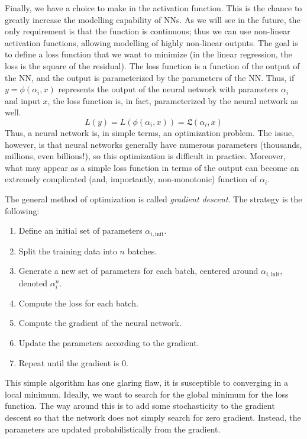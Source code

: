 Finally, we have a choice to make in the activation function. This is the chance to greatly increase the modelling capability of NNs. As we will see in the future, the only requirement is that the function is continuous; thus we can use non-linear activation functions, allowing modelling of highly non-linear outputs. The goal is to define a loss function that we want to minimize (in the linear regression, the loss is the square of the residual). The loss function is a function of the output of the NN, and the output is parameterized by the parameters of the NN. Thus, if $y=\phi(\alpha_i,x)$ represents the output of the neural network with parameters $\alpha_i$ and input $x$, the loss function is, in fact, parameterized by the neural network as well.
\begin{equation}
	L(y) = L(\phi(\alpha_i,x)) = \mathfrak{L}(\alpha_i,x)
\end{equation}
Thus, a neural network is, in simple terms, an optimization problem. The issue, however, is that neural networks generally have numerous parameters (thousands, millions, even billions!), so this optimization is difficult in practice. Moreover, what may appear as a simple loss function in terms of the output can become an extremely complicated (and, importantly, non-monotonic) function of $\alpha_i$.

The general method of optimization is called \textit{gradient descent}. The strategy is the following:
\begin{enumerate}
	\item Define an initial set of parameters $\alpha_{i,\mathrm{init}}$.
	\item Split the training data into $n$ batches.
	\item Generate a new set of parameters for each batch, centered around $\alpha_{i,\mathrm{init}}$, denoted $\alpha^{n}_{i}$.
	\item Compute the loss for each batch.
	\item Compute the gradient of the neural network.
	\item Update the parameters according to the gradient.
	\item Repeat until the gradient is 0.
\end{enumerate}
This simple algorithm has one glaring flaw, it is susceptible to converging in a local minimum. Ideally, we want to search for the global minimum for the loss function. The way around this is to add some stochasticity to the gradient descent so that the network does not simply search for zero gradient. Instead, the parameters are updated probabilistically from the gradient.


